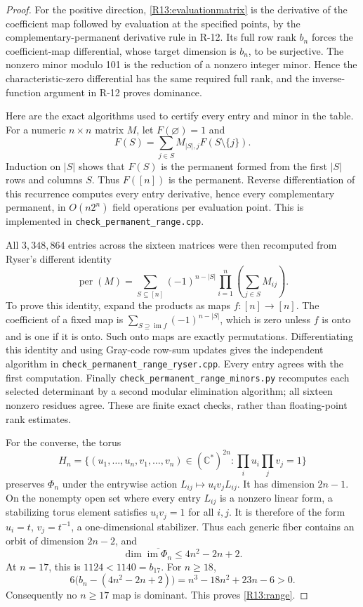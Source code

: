 \documentclass[11pt,a4paper]{article}
\theoremstyle{definition}\newtheorem{definition}{Definition}
\begin{document}
\begin{proof}
For the positive direction, \eqref{R13:evaluationmatrix} is the
derivative of the coefficient map followed by evaluation at the
specified points, by the complementary-permanent derivative
rule in R-12. Its full row rank $b_n$ forces the coefficient-map
differential, whose target dimension is $b_n$, to be surjective.
The nonzero minor modulo 101 is the reduction of a nonzero
integer minor. Hence the characteristic-zero differential has
the same required full rank, and the inverse-function argument
in R-12 proves dominance.

Here are the exact algorithms used to certify every entry and
minor in the table. For a numeric $n\times n$ matrix $M$, let
$F(\varnothing)=1$ and
\[
 F(S)=\sum_{j\in S}M_{|S|,j}F(S\setminus\{j\}).
\]
Induction on $|S|$ shows that $F(S)$ is the permanent formed from
the first $|S|$ rows and columns $S$. Thus $F([n])$ is the
permanent. Reverse differentiation of this recurrence computes
every entry derivative, hence every complementary permanent,
in $O(n2^n)$ field operations per evaluation point. This is
implemented in \texttt{check\_permanent\_range.cpp}.

All $3{,}348{,}864$ entries across the sixteen matrices were then
recomputed from Ryser's different identity
\[
 \operatorname{per}(M)=
 \sum_{S\subseteq[n]}(-1)^{n-|S|}
 \prod_{i=1}^n\left(\sum_{j\in S}M_{ij}\right).
\]
To prove this identity, expand the products as maps
$f:[n]\to[n]$. The coefficient of a fixed map is
$\sum_{S\supseteq\operatorname{im}f}(-1)^{n-|S|}$, which is zero
unless $f$ is onto and is one if it is onto. Such onto maps are
exactly permutations. Differentiating this identity and using
Gray-code row-sum updates gives the independent algorithm in
\texttt{check\_permanent\_range\_ryser.cpp}. Every entry agrees
with the first computation. Finally
\texttt{check\_permanent\_range\_minors.py} recomputes each
selected determinant by a second modular elimination algorithm;
all sixteen nonzero residues agree. These are finite exact
checks, rather than floating-point rank estimates.

For the converse, the torus
\[
 H_n=\{(u_1,\ldots,u_n,v_1,\ldots,v_n)\in(\mathbb C^*)^{2n}:
                  \prod_i u_i\prod_j v_j=1\}
\]
preserves $\Phi_n$ under the entrywise action
$L_{ij}\mapsto u_i v_jL_{ij}$. It has dimension $2n-1$.
On the nonempty open set where every entry $L_{ij}$ is a nonzero
linear form, a stabilizing torus element satisfies
$u_i v_j=1$ for all $i,j$. It is therefore of the form
$u_i=t$, $v_j=t^{-1}$, a one-dimensional stabilizer.
Thus each generic fiber contains an orbit of dimension $2n-2$,
and
\begin{equation}\label{R13:dimension}
 \dim\overline{\operatorname{im}\Phi_n}
       \leq4n^2-2n+2.
\end{equation}
At $n=17$, this is $1124<1140=b_{17}$. For $n\geq18$,
\[
 6\bigl(b_n-(4n^2-2n+2)\bigr)
 =n^3-18n^2+23n-6>0.
\]
Consequently no $n\geq17$ map is dominant. This proves
\eqref{R13:range}.


\end{proof}
\end{document}
